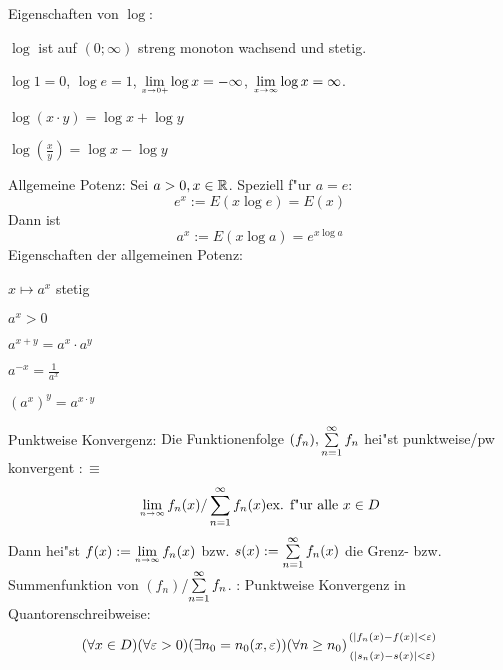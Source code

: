 \remark Eigenschaften von $\log$:{
  \begin{stmts}
    \item $\log$ ist auf $(0;\infty)$ streng monoton wachsend und stetig.
    \item $\log 1=0$, $\log e=1$, $\limx {0+} \log x=-\infty$, 
      $\limx \infty \log x=\infty$.
    \item $\log (x\cdot y)=\log x+\log y$
    \item $\log (\frac x y)=\log x-\log y$
    \end{stmts}
  }
 Allgemeine Potenz:{
  Sei $a>0,x\in\mathbb R$. Speziell f"ur $a=e$:
  \[e^x:=E(x \log e)=E(x)
    \]
  Dann ist
  \[a^x:=E(x \log a)=e^{x \log a}
    \]
}
\remark Eigenschaften der allgemeinen Potenz:{
  \begin{stmts}
    \item $x\mapsto a^x$ stetig
    \item $a^x>0$ 
    \item $a^{x+y}=a^x\cdot a^y$
    \item $a^{-x}=\frac{1}{a^x}$
    \item $\left(a^x\right)^y=a^{x\cdot y}$
    \end{stmts}
  }
 Punktweise Konvergenz:{
  Die Funktionenfolge $(f_n),\sumn 1 f_n$ hei"st punktweise/pw konvergent
  $:\equiv$ 
  \[\limn f_n(x)/\sumn 1 f_n(x) \text{ex. f"ur alle $x\in D$}
    \]
  Dann hei"st $f(x):=\limn f_n(x)$ bzw. $s(x):=\sumn 1 f_n(x)$ die
  Grenz- bzw. Summenfunktion von $(f_n)$/$\sumn 1 f_n$.
  }
\remark:{
  Punktweise Konvergenz in Quantorenschreibweise:
  \[(\forall x\defined)\epsn(\exists n_0=n_0(x,\epsilon))(\forall n\ge n_0)
      \stack({(|f_n(x)-f(x)|<\epsilon)};{(|s_n(x)-s(x)|<\epsilon)})
    \]
}

